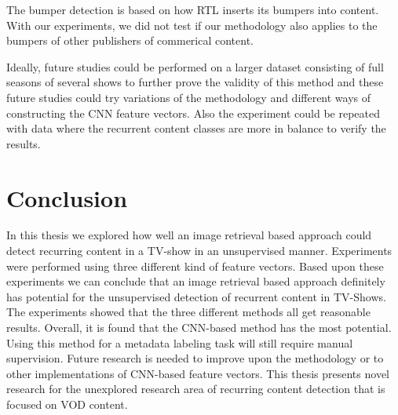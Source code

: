 \documentclass{article}
\begin{document}
The bumper detection is based on how RTL inserts its bumpers into content. With our experiments, we did not test if our methodology also applies to the bumpers of other publishers of commerical content.

Ideally, future studies could be performed on a larger dataset consisting of full seasons of several shows to further prove the validity of this method and these future studies could try variations of the methodology and different ways of constructing the CNN feature vectors. Also the experiment could be repeated with data where the recurrent content classes are more in balance to verify the results.
\\

\section{Conclusion}
In this thesis we explored how well an image retrieval based approach could detect recurring content in a TV-show in an unsupervised manner. Experiments were performed using three different kind of feature vectors. Based upon these experiments we can conclude that an image retrieval based approach definitely has potential for the unsupervised detection of recurrent content in TV-Shows. The experiments showed that the three different methods all get reasonable results. Overall, it is found that the CNN-based method has the most potential. Using this method for a metadata labeling task will still require manual supervision. Future research is needed to improve upon the methodology or to other implementations of CNN-based feature vectors. This thesis presents novel research for the unexplored research area of recurring content detection that is focused on VOD content.



\end{document}
